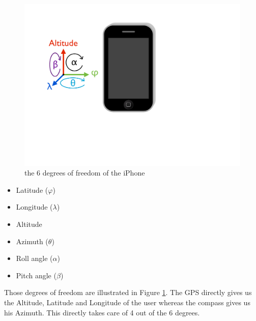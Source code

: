 \begin{figure}
\vspace{-7cm}
\center
\includegraphics[scale=0.25]{pics/iphone_orientation}
\vspace{-10pt}
\caption{the 6 degrees of freedom of the iPhone}
\label{fig:iphone_orientation}
\vspace{-20pt}
\end{figure}

\begin{itemize}
\item{Latitude ($\varphi$)}
\item{Longitude ($\lambda$)}
\item{Altitude}
\item{Azimuth ($\theta$)}
\item{Roll angle ($\alpha$)}
\item{Pitch angle ($\beta$)}
\end{itemize}

\vspace{10pt}

Those degrees of freedom are illustrated in Figure \ref{fig:iphone_orientation}. The GPS directly gives us the Altitude, Latitude and Longitude of the user whereas the compass gives us his Azimuth. This directly takes care of 4 out of the 6 degrees.\\

